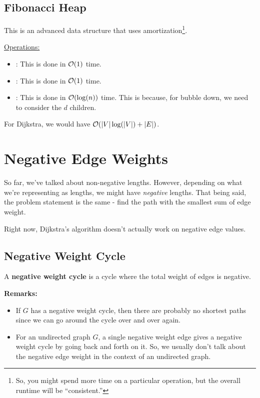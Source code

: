 \documentclass[letterpaper]{article}
\begin{document}
\subsection{Fibonacci Heap}
This is an advanced data structure that uses amortization\footnote{So, you might spend more time on a particular operation, but the overall runtime will be ``consistent.''}. 

\bigskip 

\underline{Operations:}
\begin{itemize}
    \item {}: This is done in $\mathcal{O}(1)$ time. 
    \item {}: This is done in $\mathcal{O}(1)$ time. 
    \item {}: This is done in $\mathcal{O}(\log(n))$ time. This is because, for bubble down, we need to consider the $d$ children. 
\end{itemize}
For Dijkstra, we would have $\mathcal{O}(|V|\log(|V|) + |E|)$. 

\section{Negative Edge Weights}
So far, we've talked about non-negative lengths. However, depending on what we're representing as lengths, we might have \emph{negative} lengths. That being said, the problem statement is the same - find the path with the smallest sum of edge weight. 

\bigskip 

Right now, Dijkstra's algorithm doesn't actually work on negative edge values. 

\subsection{Negative Weight Cycle}
\begin{definition}{}{}
    A \textbf{negative weight cycle} is a cycle where the total weight of edges is negative. 
\end{definition}
\textbf{Remarks:}
\begin{itemize}
    \item If $G$ has a negative weight cycle, then there are probably no shortest paths since we can go around the cycle over and over again. 
    \item For an undirected graph $G$, a single negative weight edge gives a negative weight cycle by going back and forth on it. So, we usually don't talk about the negative edge weight in the context of an undirected graph. 
\end{itemize}
\end{document}
